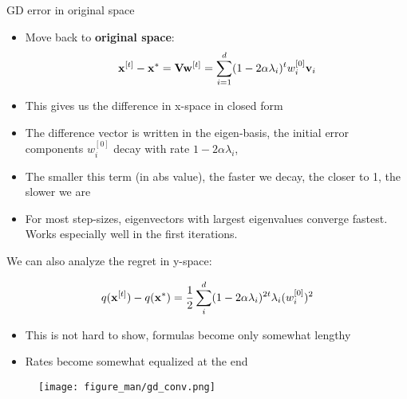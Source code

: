 \documentclass[11pt,compress,t,notes=noshow, xcolor=table]{beamer}
\begin{document}
\begin{vbframe}{GD error in original space}

\begin{itemize}
    \setlength{\itemsep}{1em}
    \item Move back to \textbf{original space}:
        \begin{equation*}
            \mathbf{x}^{[t]} - \mathbf{x}^\ast = \mathbf{V} \mathbf{w}^{[t]} = \sum_{i = 1}^{d} (1 - 2 \alpha \lambda_i)^t w_i^{[0]} \mathbf{v}_i 
        \end{equation*}
    \item This gives us the difference in x-space in closed form
    \item The difference vector is written in the eigen-basis, the initial error components $w^{[0]}_i$ decay with rate $1 - 2 \alpha \lambda_i$,
    \item The smaller this term (in abs value), the faster we decay, the closer to 1, the slower we are
    \item For most step-sizes, eigenvectors with largest eigenvalues converge fastest. Works especially well in the first iterations.
\end{itemize}

\framebreak

We can also analyze the regret in y-space:

\begin{equation*}
    q(\mathbf{x}^{[t]}) - q(\mathbf{x}^\ast) = \frac{1}{2} \sum_{i}^{d} (1 - 2 \alpha \lambda_i)^{2t} \lambda_i (w_i^{[0]})^2
\end{equation*}

\begin{itemize}
       
    \item This is not hard to show, formulas become only somewhat lengthy
    \item Rates become somewhat equalized at the end

\end{itemize}


\begin{figure}
	\texttt{[image: figure\_man/gd\_conv.png]} \\
\end{figure}








\end{vbframe}
\end{document}
